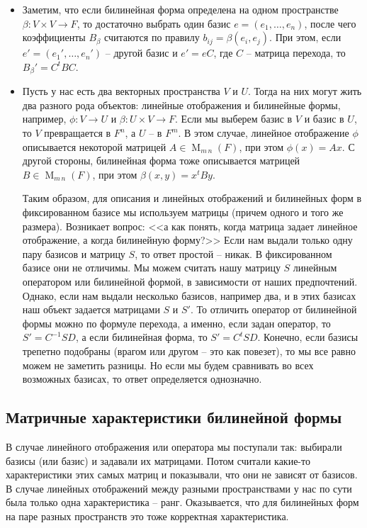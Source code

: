 \begin{itemize}
\item Заметим, что если билинейная форма определена на одном пространстве $\beta\colon V\times V\to F$, то достаточно выбрать один базис $e=(e_1,\ldots,e_n)$, после чего коэффициенты $B_\beta$ считаются по правилу $b_{ij} = \beta(e_i,e_j)$.
При этом, если $e'=(e_1',\ldots,e_n')$ -- другой базис и $e'=eC$, где $C$ -- матрица перехода, то $B_\beta' = C^t B C$.

\item Пусть у нас есть два векторных пространства $V$ и $U$.
Тогда на них могут жить два разного рода объектов: линейные отображения и билинейные формы, например, $\phi\colon V\to U$ и $\beta\colon U\times V \to F$.
Если мы выберем базис в $V$ и базис в $U$, то $V$ превращается в $F^n$, а $U$ -- в $F^m$.
В этом случае, линейное отображение $\phi$ описывается некоторой матрицей $A\in\operatorname{M}_{m\,n}(F)$, при этом $\phi(x) = Ax$.
С другой стороны, билинейная форма тоже описывается матрицей $B\in \operatorname{M}_{m\,n}(F)$, при этом $\beta(x,y) = x^tBy$.

Таким образом, для описания и линейных отображений и билинейных форм в фиксированном базисе мы используем матрицы (причем одного и того же размера).
Возникает вопрос: <<а как понять,  когда матрица задает линейное отображение, а когда билинейную форму?>> Если  нам выдали только одну пару базисов и матрицу $S$, то ответ простой -- никак.
В фиксированном базисе они не отличимы.
Мы можем считать нашу матрицу $S$ линейным оператором или билинейной формой, в зависимости от наших предпочтений.
Однако, если нам выдали несколько базисов, например два, и в этих базисах наш объект задается матрицами $S$ и $S'$.
То отличить оператор от билинейной формы можно по формуле перехода, а именно, если задан оператор, то $S' = C^{-1}S D$, а если билинейная форма, то $S' = C^t S D$.
Конечно, если базисы трепетно подобраны (врагом или другом -- это как повезет), то мы все равно можем не заметить разницы.
Но если мы будем сравнивать во всех возможных базисах, то ответ определяется однозначно.
\end{itemize}

\subsection{Матричные характеристики билинейной формы}
\label{subsection::BilChar}

В случае линейного отображения или оператора мы поступали так: выбирали базисы (или базис) и задавали их матрицами.
Потом считали какие-то характеристики этих самых матриц и показывали, что они не зависят от базисов.
В случае линейных отображений между разными пространствами у нас по сути была только одна характеристика -- ранг.
Оказывается, что для билинейных форм на паре разных пространств это тоже корректная характеристика.


